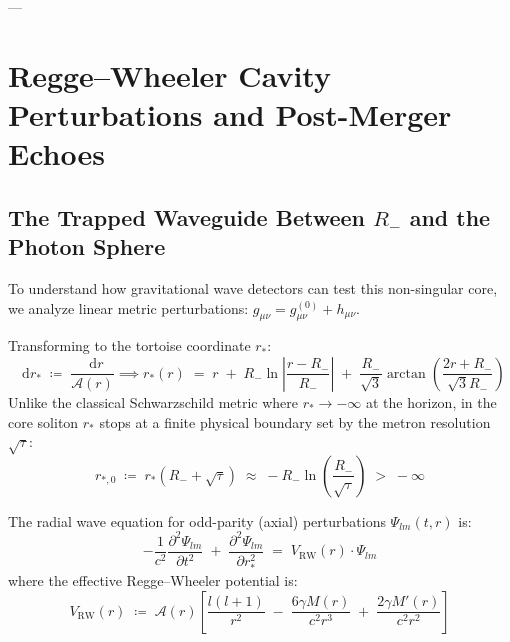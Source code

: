 \documentclass[
    12pt,
    a4paper,
    headings=normal,
    twoside=false,
    open=any,
    parskip=half
]{scrbook}
\newcommand{\diff}{\mathop{}\!\mathrm{d}}
\begin{document}
---

\section{Regge--Wheeler Cavity Perturbations and Post-Merger Echoes}
\label{sec:ch9_regge_wheeler_cavity}

\subsection{The Trapped Waveguide Between $R_-$ and the Photon Sphere}

To understand how gravitational wave detectors can test this non-singular core, we analyze linear metric perturbations: $g_{\mu\nu} = g_{\mu\nu}^{(0)} + h_{\mu\nu}$.

Transforming to the tortoise coordinate $r_*$:
\begin{equation}
\diff r_* \;\coloneqq\; \frac{\diff r}{\mathcal{A}(r)} \implies r_*(r) \;=\; r \;+\; R_- \ln\left| \frac{r - R_-}{R_-} \right| \;+\; \frac{R_-}{\sqrt{3}}\arctan\left( \frac{2r + R_-}{\sqrt{3}R_-} \right)
\label{eq:ch9_tortoise_def}
\end{equation}
Unlike the classical Schwarzschild metric where $r_* \to -\infty$ at the horizon, in the core soliton $r_*$ stops at a finite physical boundary set by the metron resolution $\sqrt{\tau}$:
\begin{equation}
r_{*,0} \;\coloneqq\; r_*(R_- + \sqrt{\tau}) \;\approx\; -R_- \ln\left( \frac{R_-}{\sqrt{\tau}} \right) \;>\; -\infty
\end{equation}

The radial wave equation for odd-parity (axial) perturbations $\Psi_{lm}(t, r)$ is:
\begin{equation}
-\frac{1}{c^2}\frac{\partial^2 \Psi_{lm}}{\partial t^2} \;+\; \frac{\partial^2 \Psi_{lm}}{\partial r_*^2} \;=\; V_{\text{RW}}(r) \cdot \Psi_{lm}
\label{eq:ch9_regge_wheeler_ode}
\end{equation}
where the effective Regge--Wheeler potential is:
\begin{equation}
V_{\text{RW}}(r) \;\coloneqq\; \mathcal{A}(r) \left[ \frac{l(l + 1)}{r^2} \;-\; \frac{6\gamma M(r)}{c^2 r^3} \;+\; \frac{2\gamma M'(r)}{c^2 r^2} \right]
\label{eq:ch9_regge_wheeler_potential}
\end{equation}
\end{document}
